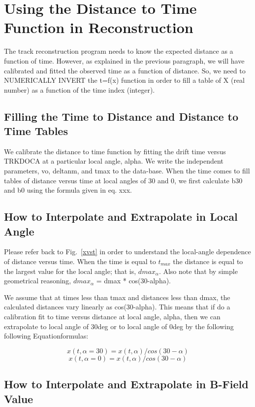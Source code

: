 \documentclass{article}
\begin{document}
\section{Using the Distance to Time Function in Reconstruction}
The track reconstruction program needs to know the expected distance as a function
of time.  However, as explained in the previous paragraph, we will have calibrated and fitted
the observed time as a function of distance.  So, we need to NUMERICALLY INVERT the t=f(x)
function in order to fill a table of X (real number) as a function of the time index (integer).

\subsection{Filling the Time to Distance and Distance to Time Tables}
We calibrate the distance to time function by fitting the drift time versus
TRKDOCA at a particular local angle, alpha.  We write the independent parameters,
vo, deltanm, and tmax to the data-base.  When the time comes to fill tables
of distance versus time at local angles of 30 and 0, we first calculate b30 and
b0 using the formula given in eq. xxx.  

\subsection{How to Interpolate and Extrapolate in Local Angle}
Please refer back to Fig.~\ref{xvst} in order to understand the local-angle dependence
of distance versus time.  When the time is equal to $t_{max}$ the distance is equal to
the largest value for the local angle; that is, $dmax_{\alpha}$.  Also note that by
simple geometrical reasoning, $dmax_{\alpha}$ = dmax * cos(30-alpha).


We assume that at times less than tmax and distances less than dmax, the calculated
distances vary linearly as cos(30-alpha).  This means that if do a calibration fit to
time versus distance at local angle, alpha, then we can extrapolate to local angle of
30deg or to local angle of 0deg by the following following Equationformulas:


\begin{equation} 
\label{eq-extrap30}
x(t,\alpha=30) = x(t,\alpha) / cos(30-\alpha) 
\end{equation}
\begin{equation} 
\label{eq-extrap0}
x(t,\alpha=0) = x(t,\alpha) / cos(30-\alpha) 
\end{equation}


\subsection{How to Interpolate and Extrapolate in B-Field Value}




\end{document}
